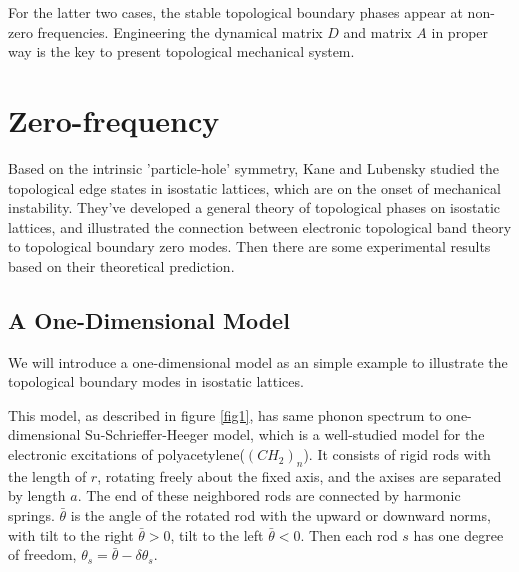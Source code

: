 \documentclass[aps,pre,preprint,groupedaddress]{revtex4-1}
\begin{document}
For the latter two cases, the stable topological boundary phases appear at non-zero frequencies. Engineering the dynamical matrix $D$ and matrix $A$ in proper way is the key to present topological mechanical system.

\section{Zero-frequency}

Based on the intrinsic 'particle-hole' symmetry, Kane and Lubensky studied the topological edge states in isostatic lattices, which are on the onset of mechanical instability. They've developed a general theory of topological phases on isostatic lattices, and illustrated the connection between electronic topological band theory to topological boundary zero modes\cite{cite-key10}. Then there are some experimental results based on their theoretical prediction\cite{cite-key19,cite-key20,cite-key21,cite-key22}.

\subsection{A One-Dimensional Model}

We will introduce a one-dimensional model as an simple example to illustrate the topological boundary modes in isostatic lattices\cite{lubensky2015phonons}.

This model, as described in figure \ref{fig1}, has same phonon spectrum to one-dimensional Su-Schrieffer-Heeger model\cite{su1979solitons}, which is a well-studied model for the electronic excitations of polyacetylene($(CH_2)_n$). It consists of rigid rods with the length of $r$, rotating freely about the fixed axis, and the axises are separated by length $a$. The end of these neighbored rods are connected by harmonic springs. $\bar{\theta}$ is the angle of the rotated rod with the upward or downward norms, with tilt to the right $\bar{\theta} > 0$, tilt to the left $\bar{\theta} < 0$. Then each rod $s$ has one degree of freedom, $\theta_s = \bar{\theta} - \delta \theta_s$.
\end{document}
